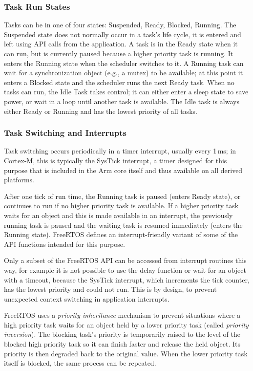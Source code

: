 \subsubsection{Task Run States}

Tasks can be in one of four states: Suspended, Ready, Blocked, Running. The Suspended state does not normally occur in a task's life cycle, it is entered and left using API calls from the application. A task is in the Ready state when it can run, but is currently paused because a higher priority task is running. It enters the Running state when the scheduler switches to it. A Running task can wait for a synchronization object (e.g., a mutex) to be available; at this point it enters a Blocked state and the scheduler runs the next Ready task. When no tasks can run, the Idle Task takes control; it can either enter a sleep state to save power, or wait in a loop until another task is available. The Idle task is always either Ready or Running and has the lowest priority of all tasks.

\subsubsection{Task Switching and Interrupts}

Task switching occurs periodically in a timer interrupt, usually every 1\,ms; in Cortex-M, this is typically the SysTick interrupt, a timer designed for this purpose that is included in the Arm core itself and thus available on all derived platforms.

After one tick of run time, the Running task is paused (enters Ready state), or continues to run if no higher priority task is available. If a higher priority task waits for an object and this is made available in an interrupt, the previously running task is paused and the waiting task is resumed immediately (enters the Running state). FreeRTOS defines an interrupt-friendly variant of some of the \gls{API} functions intended for this purpose.

Only a subset of the FreeRTOS \gls{API} can be accessed from interrupt routines this way, for example it is not possible to use the delay function or wait for an object with a timeout, because the SysTick interrupt, which increments the tick counter, has the lowest priority and could not run. This is by design, to prevent unexpected context switching in application interrupts.

FreeRTOS uses a \textit{priority inheritance} mechanism to prevent situations where a high priority task waits for an object held by a lower priority task (called \textit{priority inversion}). The blocking task's priority is temporarily raised to the level of the blocked high priority task so it can finish faster and release the held object. Its priority is then degraded back to the original value. When the lower priority task itself is blocked, the same process can be repeated.

